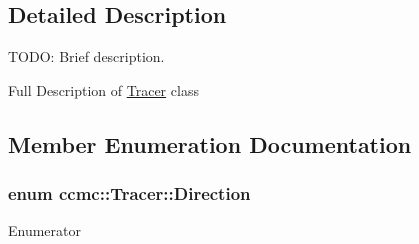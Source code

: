 \subsection{Detailed Description}
T\-O\-D\-O\-: Brief description. 

Full Description of \hyperlink{classccmc_1_1_tracer}{Tracer} class 

\subsection{Member Enumeration Documentation}
\hypertarget{classccmc_1_1_tracer_a2c914b28e2e205cb1a7c01f2941fcae2}{
\subsubsection[{Direction}]{\setlength{\rightskip}{0pt plus 5cm}enum {\bf ccmc\-::\-Tracer\-::\-Direction}}}\label{classccmc_1_1_tracer_a2c914b28e2e205cb1a7c01f2941fcae2}
\begin{Desc}
\item[Enumerator]\par
\begin{description}
\item[{\em 
\hypertarget{classccmc_1_1_tracer_a2c914b28e2e205cb1a7c01f2941fcae2a133381f1178a2affb0f1c79a67b45e52}{F\-O\-W\-A\-R\-D}\label{classccmc_1_1_tracer_a2c914b28e2e205cb1a7c01f2941fcae2a133381f1178a2affb0f1c79a67b45e52}
}]\item[{\em 
\hypertarget{classccmc_1_1_tracer_a2c914b28e2e205cb1a7c01f2941fcae2af2f8ce1e1224ce9d334d5260fa8a8526}{R\-E\-V\-E\-R\-S\-E}\label{classccmc_1_1_tracer_a2c914b28e2e205cb1a7c01f2941fcae2af2f8ce1e1224ce9d334d5260fa8a8526}
}]\end{description}
\end{Desc}


